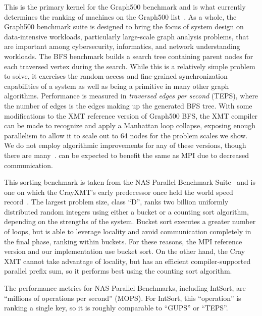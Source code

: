 \vspace{0.5ex}
 This is the primary kernel for the
Graph500 benchmark and is what currently determines the ranking of machines on
the Graph500 list~\cite{graph500list}. As a whole, the Graph500 benchmark
suite is designed to bring the focus of system design on data-intensive
workloads, particularly large-scale graph analysis problems, that are
important among cybersecurity, informatics, and network understanding
workloads. The BFS benchmark builds a search tree containing parent nodes for
each traversed vertex during the search. While this is a relatively simple
problem to solve, it exercises the random-access and fine-grained
synchronization capabilities of a system as well as being a primitive in many
other graph algorithms. Performance is measured in \emph{traversed edges per
second\/} (TEPS), where the number of edges is the edges making up the
generated BFS tree. With some modifications to the XMT reference version of Graph500 BFS,
the XMT compiler can be made to recognize and apply a Manhattan loop collapse, exposing enough parallelism to allow it to scale out to 64 nodes for the problem scales we show.
We do not employ algorithmic improvements for any of these versions, though there are
many~\cite{Beamer:Graph500,Yoo:FixedPointGraph500}. \Grappa can be expected to benefit the same as MPI due to decreased communication.

\vspace{0.5ex}
 This sorting benchmark is taken from the NAS
Parallel Benchmark Suite~\cite{Bailey91thenas,nas3.3} and is one on
which the CrayXMT's early predecessor once held the world speed
record~\cite{TeraRecord}. The largest problem size, class ``D'', ranks two billion
uniformly distributed random integers using either a bucket or a counting sort
algorithm, depending on the strengths of the system. Bucket sort executes a greater number of loops, but is able to leverage locality and avoid communication completely in the final phase, ranking within buckets.
For these reasons, the MPI reference version and our \Grappa implementation use bucket sort.
On the other hand, the Cray XMT cannot take advantage of locality, but has an efficient compiler-supported parallel prefix sum, so it performs best using the counting sort algorithm.

The performance metrics for NAS Parallel Benchmarks, including IntSort, are ``millions of operations per second'' (MOPS). For IntSort, this ``operation'' is ranking a single key, so it is roughly comparable to ``GUPS'' or ``TEPS''.
 
